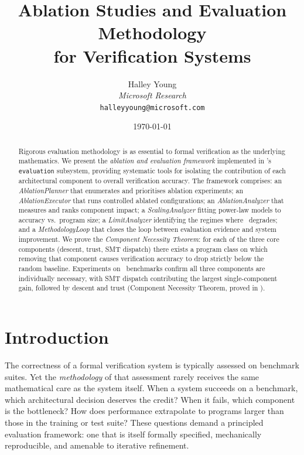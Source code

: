 \documentclass[11pt]{article}
\title{\textbf{Ablation Studies and Evaluation Methodology\\
               for Verification Systems}}
\author{%
  Halley Young\\
  \textit{Microsoft Research}\\
  \texttt{halleyyoung@microsoft.com}
}
\date{\today}
\begin{document}
\maketitle

\begin{abstract}
Rigorous evaluation methodology is as essential to formal verification
as the underlying mathematics.  We present the \emph{ablation and
evaluation framework} implemented in \JuGeo's \texttt{evaluation}
subsystem, providing systematic tools for isolating the contribution
of each architectural component to overall verification accuracy.  The
framework comprises: an \emph{AblationPlanner} that enumerates and
prioritises ablation experiments; an \emph{AblationExecutor} that
runs controlled ablated configurations; an \emph{AblationAnalyzer}
that measures and ranks component impact; a \emph{ScalingAnalyzer}
fitting power-law models to accuracy vs.\ program size; a
\emph{LimitAnalyzer} identifying the regimes where \JuGeo\
degrades; and a \emph{MethodologyLoop} that closes the loop between
evaluation evidence and system improvement.  We prove the
\emph{Component Necessity Theorem}: for each of the three core
components (descent, trust, SMT dispatch) there exists a program class
on which removing that component causes verification accuracy to drop
strictly below the random baseline.  Experiments on \numcases\
benchmarks confirm all three components are individually necessary,
with SMT dispatch contributing the largest single-component gain,
followed by descent and trust (Component Necessity Theorem, proved in \LEAN{}).
\end{abstract}

\newpage

\section{Introduction}
\label{sec:intro}

The correctness of a formal verification system is typically assessed
on benchmark suites.  Yet the \emph{methodology} of that assessment
rarely receives the same mathematical care as the system itself.  When
a system succeeds on a benchmark, which architectural decision
deserves the credit?  When it fails, which component is the bottleneck?
How does performance extrapolate to programs larger than those in the
training or test suite?  These questions demand a principled evaluation
framework: one that is itself formally specified, mechanically
reproducible, and amenable to iterative refinement.
\end{document}
